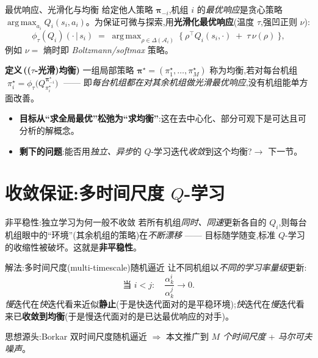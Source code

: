 \documentclass[aspectratio=169,11pt,UTF8]{ctexbeamer}
\newcommand{\calA}{\mathcal{A}}
\newcommand{\bpi}{\bm{\pi}}
\DeclareMathOperator*{\argmax}{arg\,max}
\newcommand{\emphb}[1]{\textcolor{myred}{\textbf{#1}}}
\newenvironment{defbox}[1]{\begin{block}{\color{myblue}\bfseries 定义\,(#1)}}{\end{block}}
\begin{document}
\begin{frame}{最优响应、光滑化与均衡}
\small
给定他人策略 $\bpi_{-i}$,机组 $i$ 的\emph{最优响应}是贪心策略 $\argmax_{a_i}Q_i(s_i,a_i)$。为保证可微与探索,用\emphb{光滑化最优响应}(温度 $\tau$,强凹正则 $\nu$):
\[
\phi_\tau(Q_i)(\cdot\,|\,s_i)\;=\;\argmax_{\rho\in\Delta(\calA_i)}\ \Big\{\ \rho^{\!\top}Q_i(s_i,\cdot)\;+\;\tau\,\nu(\rho)\ \Big\},
\]
例如 $\nu=$ 熵时即 \emph{Boltzmann/softmax} 策略。
\begin{defbox}{($\tau$-光滑)均衡}
一组局部策略 $\bpi^\star=(\pi_1^\star,\dots,\pi_M^\star)$ 称为均衡,若对每台机组
$\;\pi_i^\star=\phi_\tau\big(Q^{\bpi_{-i}^\star}_{\pi_i^\star}\big)\;$ —— 即\emph{每台机组都在对其余机组做光滑最优响应},没有机组能单方面改善。
\end{defbox}
\begin{itemize}\setlength\itemsep{1pt}
\item \textbf{目标从“求全局最优”松弛为“求均衡”}:这在去中心化、部分可观下是可达且可分析的解概念。
\item \textbf{剩下的问题}:能否用\emph{独立、异步}的 $Q$-学习迭代\emph{收敛}到这个均衡?$\to$ 下一节。
\end{itemize}
\end{frame}

\section{收敛保证:多时间尺度 $Q$-学习}

\begin{frame}{非平稳性:独立学习为何一般不收敛}
\small
若所有机组\emph{同时、同速}更新各自的 $Q_i$,则每台机组眼中的“环境”(其余机组的策略)在\emph{不断漂移} —— 目标随学随变,标准 $Q$-学习的收缩性被破坏。这就是\emphb{非平稳性}。
\vspace{1mm}
\begin{block}{解法:多时间尺度(multi-timescale)随机逼近}
让不同机组以\emph{不同的学习率量级}更新:
\[
\text{当 } i<j:\quad \frac{\alpha^i_k}{\alpha^j_k}\to 0.
\]
\emph{慢}迭代在\emph{快}迭代看来近似\emphb{静止}(于是快迭代面对的是平稳环境);\emph{快}迭代在\emph{慢}迭代看来已\emphb{收敛到均衡}(于是慢迭代面对的是已达最优响应的对手)。
\end{block}
\centering
思想源头:Borkar 双时间尺度随机逼近 $\Rightarrow$ 本文推广到 \emph{$M$ 个时间尺度} + \emph{马尔可夫噪声}。
\end{frame}
\end{document}
